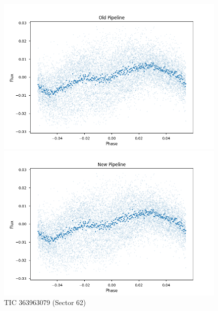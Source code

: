 \documentclass{article}
\begin{document}
\begin{figure}[h!]
    \centering
    \begin{minipage}{0.45\textwidth}
        \centering
        \includegraphics[width=\textwidth]{./figures/0_old.png}
    \end{minipage}%
    \hfill
    \begin{minipage}{0.45\textwidth}
        \centering
        \includegraphics[width=\textwidth]{./figures/0_new.png}
    \end{minipage}
    \caption{TIC 363963079 (Sector 62)}
\end{figure}
\end{document}
